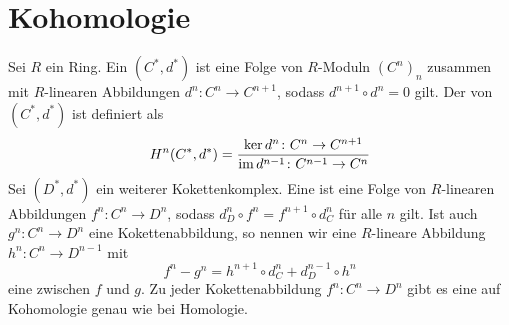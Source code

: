 
\newcommand{\fach}{Topologie \RM{2}.}
\newcommand{\semester}{WiSe 2015}
\newcommand{\homepage}{https://wwwmath.uni-muenster.de/reine/u/topos/lehre/WS2015-2016/Topologie2/}

\newcommand{\prof}{Prof.\ Dr.\ Arthur Bartels}
\publishers{\scalebox{11}{\Huge$H^*$}}



\maketitle
\begin{abstract}

\end{abstract}

\tableofcontents
\cleardoubleoddemptypage

\setcounter{page}{1}
\setcounter{footnote}{0}

\section{Kohomologie} %
\label{sec:1}

\begin{definition}[{name=[Kokettenkomplex und Kohomologie]}]
	Sei $R$ ein Ring. Ein  $(C^*,d^*)$ ist eine Folge von $R$-Moduln $(C^n)_{n}$ zusammen mit $R$-linearen Abbildungen 
	$d^n \colon C^n \to C^{n+1}$, sodass $d^{n+1} \circ d^n =0$ gilt. Der  von $(C^*,d^*)$ ist definiert als 
	\[
		H^n(C^*,d^*) = \frac{\ker d^n \colon C^n \to C^{n+1}}{\operatorname{im} d^{n-1} \colon C^{n-1} \to C^n} 
	\]
	Sei $(D^*,d^{*})$ ein weiterer Kokettenkomplex.
	Eine  ist eine Folge von $R$-linearen Abbildungen $f^n\colon C^n\to D^n$, sodass $ d^n_D \circ f^n = f^{n+1}\circ d^n_C$ für alle $n$ gilt. Ist 
	auch $g^n \colon C^n \to D^n$ eine Kokettenabbildung, so nennen wir eine $R$-lineare Abbildung $h^n \colon C^n \to D^{n-1}$ mit
	\[
		f^n - g^n  = h^{n+1} \circ d_C^n + d_D^{n-1} \circ h^n 
	\]
	eine  zwischen $f$ und $g$. Zu jeder Kokettenabbildung $f^n\colon C^n\to D^n$ gibt es eine 
	 auf Kohomologie genau wie bei Homologie.
	
\end{definition}

